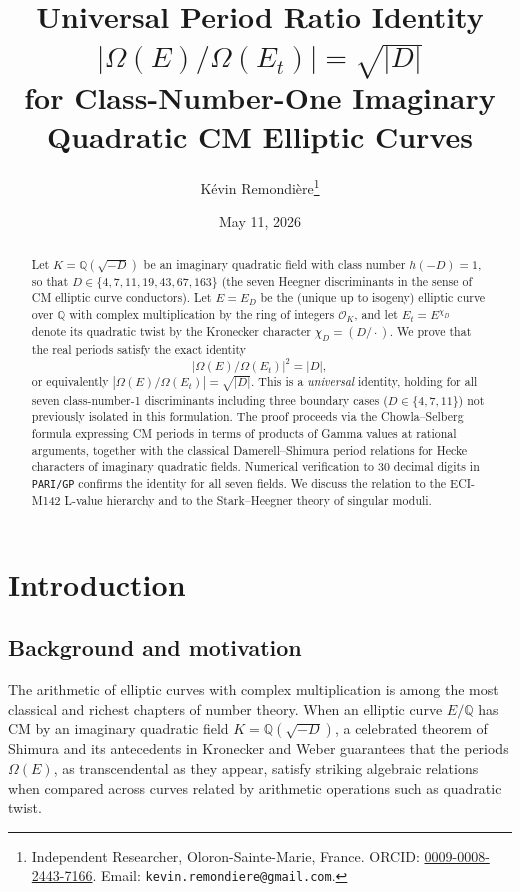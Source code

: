 \documentclass[12pt,a4paper]{article}
\title{Universal Period Ratio Identity
$|\Omega(E)/\Omega(E_t)| = \sqrt{|D|}$\\
for Class-Number-One Imaginary Quadratic CM Elliptic Curves}
\author{Kévin Remondière\thanks{Independent Researcher, Oloron-Sainte-Marie, France. ORCID: \href{https://orcid.org/0009-0008-2443-7166}{0009-0008-2443-7166}. Email: \texttt{kevin.remondiere@gmail.com}.}}
\date{May 11, 2026}
\theoremstyle{plain}
\theoremstyle{definition}
\newcommand{\Q}{\mathbb{Q}}
\newcommand{\OK}{\mathcal{O}_K}
\begin{document}
\maketitle

\begin{abstract}
Let $K = \Q(\sqrt{-D})$ be an imaginary quadratic field with class number
$h(-D) = 1$, so that $D \in \{4, 7, 11, 19, 43, 67, 163\}$ (the seven
Heegner discriminants in the sense of CM elliptic curve conductors).
Let $E = E_D$ be the (unique up to isogeny) elliptic curve over $\Q$ with
complex multiplication by the ring of integers $\OK$, and let $E_t = E^{\chi_D}$
denote its quadratic twist by the Kronecker character $\chi_D = (D/\cdot)$.
We prove that the real periods satisfy the exact identity
\[
  \bigl|\Omega(E)/\Omega(E_t)\bigr|^2 = |D|,
\]
or equivalently $|\Omega(E)/\Omega(E_t)| = \sqrt{|D|}$.
This is a \emph{universal} identity, holding for all seven class-number-1
discriminants including three boundary cases ($D \in \{4, 7, 11\}$) not
previously isolated in this formulation.
The proof proceeds via the Chowla--Selberg formula expressing CM periods in
terms of products of Gamma values at rational arguments, together with the
classical Damerell--Shimura period relations for Hecke characters of imaginary
quadratic fields.
Numerical verification to 30 decimal digits in \texttt{PARI/GP} confirms the
identity for all seven fields.
We discuss the relation to the ECI-M142 L-value hierarchy and to the
Stark--Heegner theory of singular moduli.
\end{abstract}

\tableofcontents

\newpage

\section{Introduction}
\label{sec:intro}

\subsection{Background and motivation}

The arithmetic of elliptic curves with complex multiplication is among the
most classical and richest chapters of number theory.  When an elliptic
curve $E/\Q$ has CM by an imaginary quadratic field $K = \Q(\sqrt{-D})$,
a celebrated theorem of Shimura \cite{Shimura1971} and its
antecedents in Kronecker and Weber guarantees that the periods $\Omega(E)$,
as transcendental as they appear, satisfy striking algebraic relations when
compared across curves related by arithmetic operations such as quadratic
twist.
\end{document}
